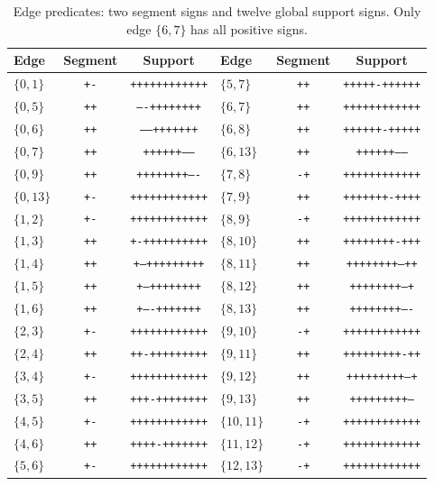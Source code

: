 \begin{table}[ht]
\centering\footnotesize
\caption{Edge predicates: two segment signs and twelve global support signs. Only edge $\{6,7\}$ has all positive signs.}\label{tab:edgeledger}
\begin{tabular}{lcc@{\qquad}lcc}
\toprule
Edge & Segment & Support & Edge & Segment & Support\\
\midrule
$\{0,1\}$ & \texttt{+-} & \texttt{++++++++++++} & $\{5,7\}$ & \texttt{++} & \texttt{+++++-++++++}\\
$\{0,5\}$ & \texttt{++} & \texttt{----++++++++} & $\{6,7\}$ & \texttt{++} & \texttt{++++++++++++}\\
$\{0,6\}$ & \texttt{++} & \texttt{-----+++++++} & $\{6,8\}$ & \texttt{++} & \texttt{++++++-+++++}\\
$\{0,7\}$ & \texttt{++} & \texttt{++++++------} & $\{6,13\}$ & \texttt{++} & \texttt{++++++------}\\
$\{0,9\}$ & \texttt{++} & \texttt{++++++++----} & $\{7,8\}$ & \texttt{-+} & \texttt{++++++++++++}\\
$\{0,13\}$ & \texttt{+-} & \texttt{++++++++++++} & $\{7,9\}$ & \texttt{++} & \texttt{+++++++-++++}\\
$\{1,2\}$ & \texttt{+-} & \texttt{++++++++++++} & $\{8,9\}$ & \texttt{-+} & \texttt{++++++++++++}\\
$\{1,3\}$ & \texttt{++} & \texttt{+-++++++++++} & $\{8,10\}$ & \texttt{++} & \texttt{++++++++-+++}\\
$\{1,4\}$ & \texttt{++} & \texttt{+--+++++++++} & $\{8,11\}$ & \texttt{++} & \texttt{++++++++--++}\\
$\{1,5\}$ & \texttt{++} & \texttt{+---++++++++} & $\{8,12\}$ & \texttt{++} & \texttt{++++++++---+}\\
$\{1,6\}$ & \texttt{++} & \texttt{+----+++++++} & $\{8,13\}$ & \texttt{++} & \texttt{++++++++----}\\
$\{2,3\}$ & \texttt{+-} & \texttt{++++++++++++} & $\{9,10\}$ & \texttt{-+} & \texttt{++++++++++++}\\
$\{2,4\}$ & \texttt{++} & \texttt{++-+++++++++} & $\{9,11\}$ & \texttt{++} & \texttt{+++++++++-++}\\
$\{3,4\}$ & \texttt{+-} & \texttt{++++++++++++} & $\{9,12\}$ & \texttt{++} & \texttt{+++++++++--+}\\
$\{3,5\}$ & \texttt{++} & \texttt{+++-++++++++} & $\{9,13\}$ & \texttt{++} & \texttt{+++++++++---}\\
$\{4,5\}$ & \texttt{+-} & \texttt{++++++++++++} & $\{10,11\}$ & \texttt{-+} & \texttt{++++++++++++}\\
$\{4,6\}$ & \texttt{++} & \texttt{++++-+++++++} & $\{11,12\}$ & \texttt{-+} & \texttt{++++++++++++}\\
$\{5,6\}$ & \texttt{+-} & \texttt{++++++++++++} & $\{12,13\}$ & \texttt{-+} & \texttt{++++++++++++}\\
\bottomrule
\end{tabular}
\end{table}
